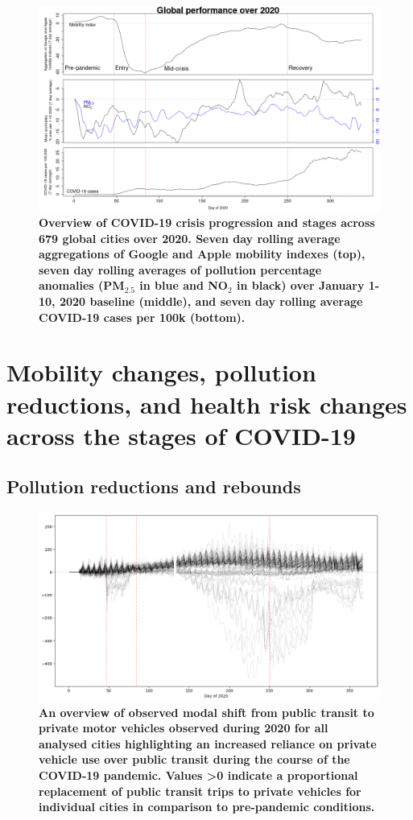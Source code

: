 \documentclass[preprint,10pt]{elsarticle} %
\begin{document}
\begin{figure}
\centering
\includegraphics[trim={0 0 15 20},clip,scale=0.45]{Images/LancetPHOverall.png}
\caption{\bf Overview of COVID-19 crisis progression and stages across 679 global cities over 2020. Seven day rolling average aggregations of Google and Apple mobility indexes (top), seven day rolling averages of pollution percentage anomalies (PM$_{2.5}$ in blue and NO$_{2}$ in black) over January 1-10, 2020 baseline (middle), and seven day rolling average COVID-19 cases per 100k (bottom).}
 \label{fig:stages}
\end{figure}

\section*{\textcolor{OliveGreen}{Mobility changes, pollution reductions, and health risk changes across the stages of COVID-19}}
\subsection*{Pollution reductions and rebounds}

\begin{figure}
\centering
\includegraphics[trim={0 0 0 0},clip,scale=0.4]{Images/DrivingvsTransit.png}
\caption{\bf An overview of observed modal shift from public transit to private motor vehicles observed during 2020 for all analysed cities highlighting an increased reliance on private vehicle use over public transit during the course of the COVID-19 pandemic. Values \textgreater 0 indicate a proportional replacement of public transit trips to private vehicles for individual cities in comparison to pre-pandemic conditions.}  
 \label{fig:driv_trans}
\end{figure}
\end{document}
